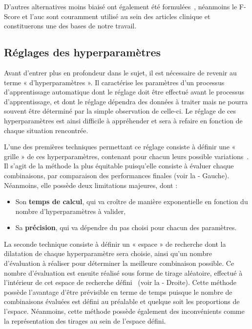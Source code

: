 D'autres alternatives moins biaisé ont également été formulées~\cite{Sokolova2006}, néanmoins le F-Score et l'\gls{auc} sont couramment utilisé au sein des articles clinique et constituerons une des bases de notre travail.\par

\subsection{Réglages des hyperparamètres}
\label{subsec:hyperparameter}
Avant d’entrer plus en profondeur dans le sujet, il est nécessaire de revenir au terme « d’hyperparamètres ». Il caractérise les paramètres d'un processus d'apprentissage automatique dont le réglage doit être effectué avant le processus d’apprentissage, et dont le réglage dépendra des données à traiter mais ne pourra souvent être déterminé par la simple observation de celle-ci. Le réglage de ces hyperparamètres est ainsi difficile à appréhender et sera à refaire en fonction de chaque situation rencontrée.\par

L’une des premières techniques permettant ce réglage consiste à définir une « grille » de ces hyperparamètres, contenant pour chacun leurs possible variations~\cite{Liu2006}. Il s'agit de la méthode la plus équitable puisqu'elle consiste à évaluer chaque combinaisons, par comparaison des performances finales (voir la  - Gauche). Néanmoins, elle possède deux limitations majeures, dont :
\begin{itemize}
    \item Son \textbf{temps de calcul}, qui va croître de manière exponentielle en fonction du nombre d'hyperparamètres à valider,
    \item Sa \textbf{précision}, qui va dépendre du pas choisi pour chacun des paramètres.
\end{itemize}\par

La seconde technique consiste à définir un « espace » de recherche dont la dilatation de chaque hyperparamètre sera choisie, ainsi qu'un nombre d'évaluation à réaliser pour déterminer la meilleure combinaison possible. Ce nombre d'évaluation est ensuite réalisé sous forme de tirage aléatoire, effectué à l'intérieur de cet espace de recherche défini~\cite{bergstra2012} (voir la  - Droite). Cette méthode possède l'avantage d'être prévisible en terme de temps puisque le nombre de combinaisons évaluées est défini au préalable et quelque soit les proportions de l'espace. Néanmoins, cette méthode possède également des inconvénients comme la représentation des tirages au sein de l'espace défini.

